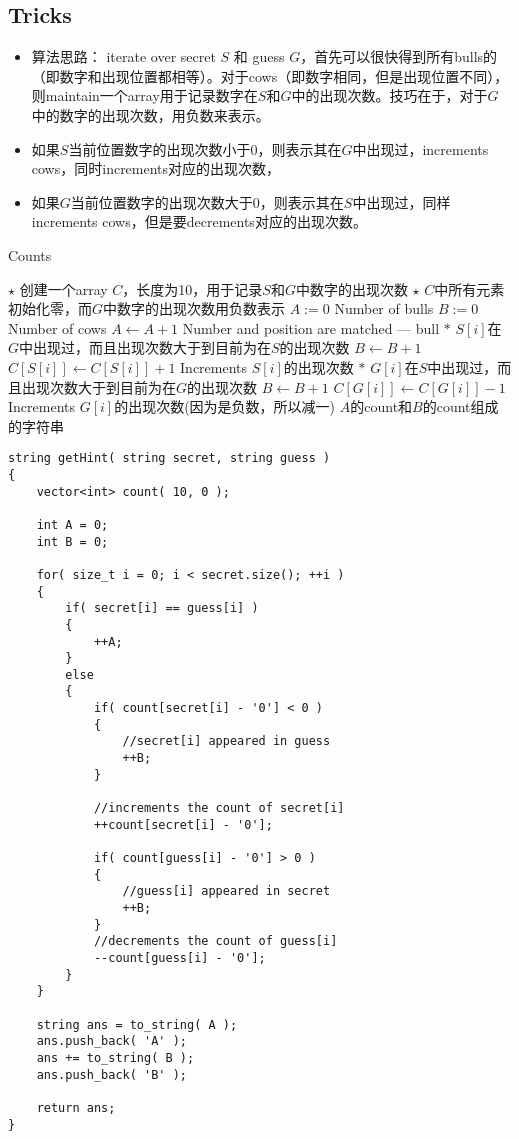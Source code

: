 \subsection{Tricks}
\begin{itemize}
\item 算法思路： iterate over secret $S$ 和 guess $G$，首先可以很快得到所有bulls的（即数字和出现位置都相等）。对于cows（即数字相同，但是出现位置不同），则maintain一个array用于记录数字在$S$和$G$中的出现次数。技巧在于，对于$G$中的数字的出现次数，用负数来表示。
\item 如果$S$当前位置数字的出现次数小于0，则表示其在$G$中出现过，increments cows，同时increments对应的出现次数，
\item 如果$G$当前位置数字的出现次数大于0，则表示其在$S$中出现过，同样increments cows，但是要decrements对应的出现次数。
\end{itemize}
\setcounter{algorithm}{0}
\begin{algorithm}[H]
\caption{Counts}
\begin{algorithmic}[1]
\State $\star$ 创建一个array $C$，长度为10，用于记录$S$和$G$中数字的出现次数
\State $\star$ $C$中所有元素初始化零，而$G$中数字的出现次数用负数表示
\State $A:=0$ \Comment Number of bulls
\State $B:=0$ \Comment Number of cows
\State $A\gets A+1$ \Comment Number and position are matched --- bull
\Else
{} 
\State $\ast$ $S[i]$在$G$中出现过，而且出现次数大于到目前为在$S$的出现次数
\State $B\gets B+1$
\EndIf
\State $C[S[i]]\gets C[S[i]] +1$ \Comment Increments $S[i]$的出现次数
\State $\ast$ $G[i]$在$S$中出现过，而且出现次数大于到目前为在$G$的出现次数
\State $B\gets B+1$
\EndIf
\State $C[G[i]]\gets C[G[i]] -1$ \Comment Increments $G[i]$的出现次数(因为是负数，所以减一)
\EndIf
\EndFor
\State \Return $A$的count和$B$的count组成的字符串
\EndProcedure
\end{algorithmic}
\end{algorithm}
\setcounter{lstlisting}{0}
\begin{lstlisting}[style=customc, caption={Counts}]
string getHint( string secret, string guess )
{
    vector<int> count( 10, 0 );

    int A = 0;
    int B = 0;

    for( size_t i = 0; i < secret.size(); ++i )
    {
        if( secret[i] == guess[i] )
        {
            ++A;
        }
        else
        {
            if( count[secret[i] - '0'] < 0 )
            {
                //secret[i] appeared in guess
                ++B;
            }

            //increments the count of secret[i]
            ++count[secret[i] - '0'];

            if( count[guess[i] - '0'] > 0 )
            {
                //guess[i] appeared in secret
                ++B;
            }
            //decrements the count of guess[i]
            --count[guess[i] - '0'];
        }
    }

    string ans = to_string( A );
    ans.push_back( 'A' );
    ans += to_string( B );
    ans.push_back( 'B' );

    return ans;
}
\end{lstlisting}
